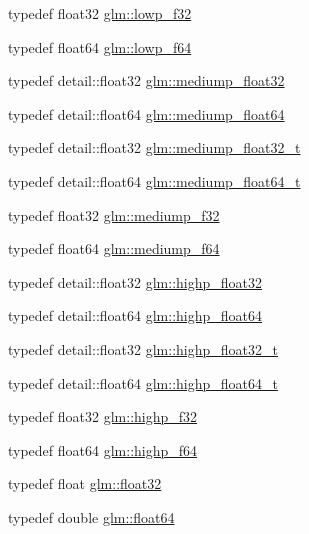 \begin{CompactItemize}
\item 
typedef float32 \hyperlink{group__gtc__type__precision_g1b9734de4b4429dc26b1454a2a399b05}{glm::lowp\_\-f32}
\item 
typedef float64 \hyperlink{group__gtc__type__precision_g59839f4bf6b97c93b0def577890bbfb8}{glm::lowp\_\-f64}
\item 
typedef detail::float32 \hyperlink{group__gtc__type__precision_g1b5f74cbeed0c9d42cd57d77609be7ee}{glm::mediump\_\-float32}
\item 
typedef detail::float64 \hyperlink{group__gtc__type__precision_g9225ae6aed0f90b6eb65bf8d466199c1}{glm::mediump\_\-float64}
\item 
typedef detail::float32 \hyperlink{group__gtc__type__precision_gcbd406715148db96c9d9d2a2ef6460de}{glm::mediump\_\-float32\_\-t}
\item 
typedef detail::float64 \hyperlink{group__gtc__type__precision_g97a0747b103eb5ef320a91888de52f51}{glm::mediump\_\-float64\_\-t}
\item 
typedef float32 \hyperlink{group__gtc__type__precision_g3dbba6bd06a546d7a11d1c09c2f04b1a}{glm::mediump\_\-f32}
\item 
typedef float64 \hyperlink{group__gtc__type__precision_gbd273bd38ea5e013aeec9ffd2b2591fb}{glm::mediump\_\-f64}
\item 
typedef detail::float32 \hyperlink{group__gtc__type__precision_g91af7513c1102410646f2c435ca29be5}{glm::highp\_\-float32}
\item 
typedef detail::float64 \hyperlink{group__gtc__type__precision_gb871a78c548d2fa53e1e8ec64a46eee7}{glm::highp\_\-float64}
\item 
typedef detail::float32 \hyperlink{group__gtc__type__precision_g4e16a7818d09e2da3b81765999f23928}{glm::highp\_\-float32\_\-t}
\item 
typedef detail::float64 \hyperlink{group__gtc__type__precision_ge8b3b2ace5be2a61c6bf63f12643fa15}{glm::highp\_\-float64\_\-t}
\item 
typedef float32 \hyperlink{group__gtc__type__precision_g48d80b6fd3a40b71b2e414493832d1ca}{glm::highp\_\-f32}
\item 
typedef float64 \hyperlink{group__gtc__type__precision_gb1306a5a8ae99fb2867b548b1546bbe0}{glm::highp\_\-f64}
\item 
typedef float \hyperlink{group__gtc__type__precision_g814f2f65354b6588b067cc5c67a6b340}{glm::float32}
\item 
typedef double \hyperlink{group__gtc__type__precision_gb721f828b41f46b20cf4883b50733d3b}{glm::float64}

\end{CompactItemize}

